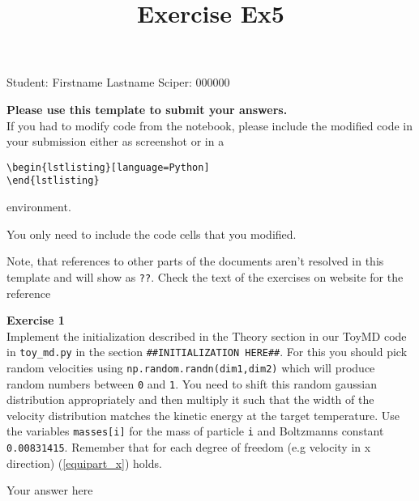 \documentclass{article}
\title{Exercise Ex5}
\begin{document}
\maketitle\maketitle
\begin{center}\logo\end{center}


Student:  Firstname Lastname    Sciper: 000000

\begin{mdframed}
\textbf{Please use this template to submit your answers.}\\
If you had to modify code from the notebook, please include the modified code in your submission either as screenshot or in a

\begin{verbatim}
\begin{lstlisting}[language=Python]
\end{lstlisting}
\end{verbatim}

environment.

You only need to include the code cells that you modified.

Note, that references to other parts of the documents aren't resolved in this template and will show as \texttt{??}. Check the text of the exercises on website for the reference
\end{mdframed}

\begin{mdframed}
\textbf{Exercise 1}\\
Implement the initialization described in the Theory section in our ToyMD code in \texttt{toy\_md.py} in the section \texttt{\#\#INITIALIZATION HERE\#\#}. For this you should pick random velocities using \texttt{np.random.randn(dim1,dim2)} which will produce random numbers between \texttt{0} and \texttt{1}. You need to shift this random gaussian distribution appropriately and then multiply it such that the width of the velocity distribution matches the kinetic energy at the target temperature. Use the variables \texttt{masses[i]} for the mass of particle \texttt{i} and Boltzmanns constant \texttt{0.00831415}. Remember that for each degree of freedom (e.g velocity in x direction) (\ref{equipart_x}) holds.
\end{mdframed}

Your answer here
\end{document}
